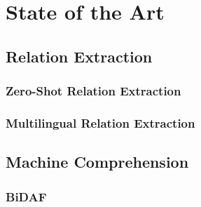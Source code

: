 \chapter{State of the Art} %
\label{chpt:3}
\section{Relation Extraction}
\subsection{Zero-Shot Relation Extraction}
\subsection{Multilingual Relation Extraction}

\section{Machine Comprehension}
\subsection{BiDAF}
